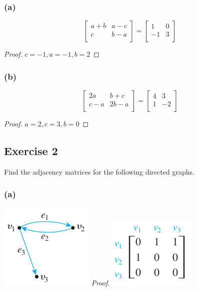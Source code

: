 \documentclass[14pt]{extarticle}
\begin{document}
\subsubsection{(a)}
\[
\left[ 
\begin{array}{cc}
a + b & a - c \\
c & b - a \\
\end{array}
\right] = 
\left[ 
\begin{array}{rr}
1 & 0 \\
-1 & 3 \\
\end{array}
\right]
\]
\begin{proof}
\(c=-1, a=-1, b=2\)
\end{proof}

\subsubsection{(b)}
\[
\left[ 
\begin{array}{cc}
2a & b + c \\
c - a & 2b - a \\
\end{array}
\right] = 
\left[ 
\begin{array}{rr}
4 & 3 \\
1 & -2 \\
\end{array}
\right]
\]
\begin{proof}
\(a=2, c=3, b=0\)
\end{proof}

\subsection{Exercise 2}
Find the adjacency matrices for the following directed graphs.

\subsubsection{(a)}
\includegraphics[scale=0.6]{../images/10.2.2.a.1.png}
{\it Proof.}
\includegraphics[scale=0.6]{../images/10.2.2.a.png}
\end{document}
